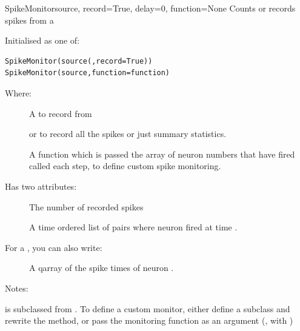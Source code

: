 \documentclass[letterpaper,10pt,english]{manual}
\begin{document}
\hypertarget{brian.SpikeMonitor}{}\begin{classdesc}{SpikeMonitor}{source, record=True, delay=0, function=None}
Counts or records spikes from a \hyperlink{brian.NeuronGroup}{}

Initialised as one of:

\begin{Verbatim}[commandchars=@\[\]]
SpikeMonitor(source(,record=True))
SpikeMonitor(source,function=function)
\end{Verbatim}

Where:
\begin{description}
\item[]
A \hyperlink{brian.NeuronGroup}{} to record from

\item[]
 or  to record all the spikes or just summary
statistics.

\item[]
A function  which is passed the array of neuron
numbers that have fired called each step, to define
custom spike monitoring.

\end{description}

Has two attributes:
\begin{description}
\item[]
The number of recorded spikes

\item[]
A time ordered list of pairs  where neuron  fired
at time .

\end{description}

For  a \hyperlink{brian.SpikeMonitor}{}, you can also write:
\begin{description}
\item[]
A qarray of the spike times of neuron .

\end{description}

Notes:

\hyperlink{brian.SpikeMonitor}{} is subclassed from \hyperlink{brian.Connection}{}.
To define a custom monitor, either define a subclass and
rewrite the  method, or pass the monitoring function
as an argument (, with )
\end{classdesc}
\end{document}
